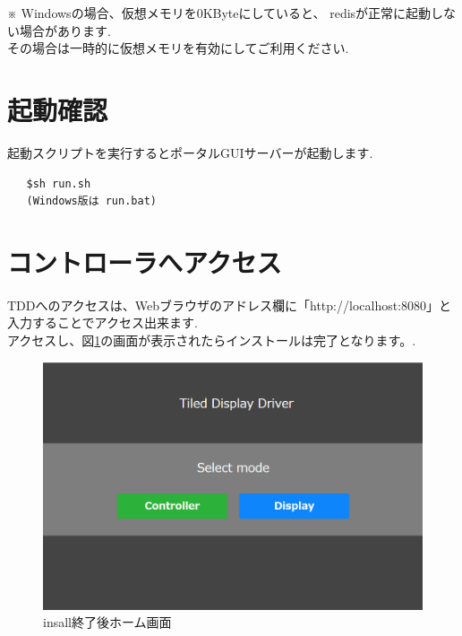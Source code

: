 \documentclass[a4paper,10pt,oneside]{jsbook}
\begin{document}
※
Windowsの場合、仮想メモリを0KByteにしていると、
redisが正常に起動しない場合があります.\\
その場合は一時的に仮想メモリを有効にしてご利用ください.\\

\newpage


\section{起動確認}
起動スクリプトを実行するとポータルGUIサーバーが起動します.
\begin{verbatim}
   $sh run.sh
   (Windows版は run.bat)
\end{verbatim}

\section{コントローラへアクセス}
TDDへのアクセスは、Webブラウザのアドレス欄に「http://localhost:8080」と入力することでアクセス出来ます.\\
アクセスし、図\ref{fig:home}の画面が表示されたらインストールは完了となります。.\\

\begin{figure}[htbp]
	\begin{center}
		\includegraphics[width=15.5cm]{image/home.png}
	\end{center}
	\caption{insall終了後ホーム画面}
	\label{fig:home}
\end{figure}

\newpage
\end{document}
